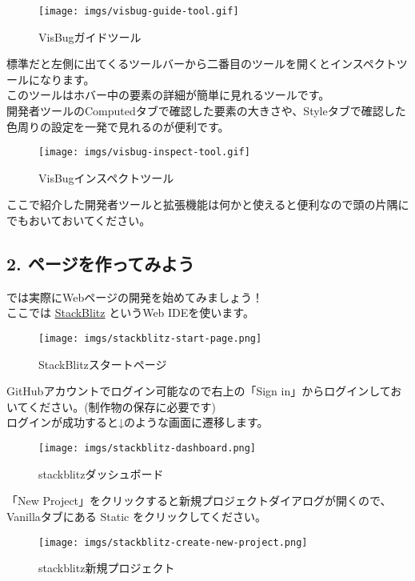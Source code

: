 \begin{figure}
\centering
\texttt{[image: imgs/visbug-guide-tool.gif]}
\caption{VisBugガイドツール}
\end{figure}

標準だと左側に出てくるツールバーから二番目のツールを開くとインスペクトツールになります。\\
このツールはホバー中の要素の詳細が簡単に見れるツールです。\\
開発者ツールのComputedタブで確認した要素の大きさや、Styleタブで確認した色周りの設定を一発で見れるのが便利です。

\begin{figure}
\centering
\texttt{[image: imgs/visbug-inspect-tool.gif]}
\caption{VisBugインスペクトツール}
\end{figure}

ここで紹介した開発者ツールと拡張機能は何かと使えると便利なので頭の片隅にでもおいておいてください。

\subsection{2.
ページを作ってみよう}\label{ux30daux30fcux30b8ux3092ux4f5cux3063ux3066ux307fux3088ux3046}

では実際にWebページの開発を始めてみましょう！\\
ここでは \href{https://stackblitz.com/?starters=vanilla}{StackBlitz}
というWeb IDEを使います。

\begin{figure}
\centering
\texttt{[image: imgs/stackblitz-start-page.png]}
\caption{StackBlitzスタートページ}
\end{figure}

GitHubアカウントでログイン可能なので右上の「Sign
in」からログインしておいてください。(制作物の保存に必要です)\\
ログインが成功すると↓のような画面に遷移します。

\begin{figure}
\centering
\texttt{[image: imgs/stackblitz-dashboard.png]}
\caption{stackblitzダッシュボード}
\end{figure}

「New
Project」をクリックすると新規プロジェクトダイアログが開くので、Vanillaタブにある
Static をクリックしてください。

\begin{figure}
\centering
\texttt{[image: imgs/stackblitz-create-new-project.png]}
\caption{stackblitz新規プロジェクト}
\end{figure}

